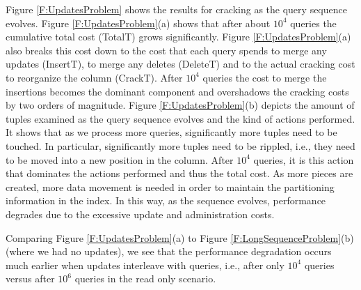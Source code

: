 Figure \ref{F:UpdatesProblem} shows the results for cracking as the query sequence evolves.
Figure \ref{F:UpdatesProblem}(a) shows that after about $10^4$ queries the 
cumulative total cost (TotalT) grows significantly. 
Figure \ref{F:UpdatesProblem}(a) also breaks this cost down to the cost that each query spends
to merge any updates (InsertT), to merge any deletes (DeleteT) and to the actual cracking cost to reorganize the 
column (CrackT). After $10^4$ queries the cost to merge the insertions becomes the dominant component and overshadows
the cracking costs by two orders of magnitude.
Figure \ref{F:UpdatesProblem}(b) depicts the amount of tuples examined as the query sequence evolves 
and the kind of actions performed. 
It shows that as we process more queries, significantly more tuples need to be touched.
In particular, significantly more tuples need to be rippled, i.e., they need to be moved into a new position
in the column. After $10^4$ queries, it is this action that dominates the actions performed and thus the total cost.
As more pieces are created, more data movement is needed in order to maintain
the partitioning information in the index. In this way, as the sequence evolves, performance degrades
due to the excessive update and administration costs.

Comparing Figure \ref{F:UpdatesProblem}(a) to 
Figure \ref{F:LongSequenceProblem}(b) (where we had no updates), we see that the performance
degradation occurs much earlier when updates interleave with queries, 
i.e., after only $10^4$ queries versus after $10^6$ queries in the read only scenario. 






